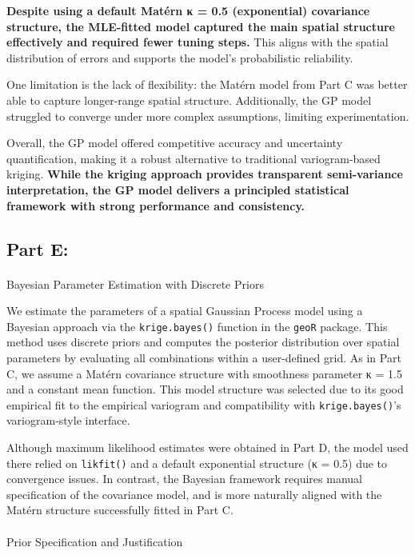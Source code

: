 \documentclass[
  11pt,
]{article}
\makeatletter
\let\oldparagraph\paragraph
\renewcommand{\paragraph}{
    \@ifstar
      \xxxParagraphStar
      \xxxParagraphNoStar
  }
\newcommand{\xxxParagraphStar}[1]{\oldparagraph*{#1}\mbox{}}
\newcommand{\xxxParagraphNoStar}[1]{\oldparagraph{#1}\mbox{}}
\makeatother
\begin{document}
\textbf{Despite using a default Matérn κ = 0.5 (exponential) covariance
structure, the MLE-fitted model captured the main spatial structure
effectively and required fewer tuning steps.} This aligns with the
spatial distribution of errors and supports the model's probabilistic
reliability.

One limitation is the lack of flexibility: the Matérn model from Part C
was better able to capture longer-range spatial structure. Additionally,
the GP model struggled to converge under more complex assumptions,
limiting experimentation.

Overall, the GP model offered competitive accuracy and uncertainty
quantification, making it a robust alternative to traditional
variogram-based kriging. \textbf{While the kriging approach provides
transparent semi-variance interpretation, the GP model delivers a
principled statistical framework with strong performance and
consistency.}

\subsection{Part E:}\label{part-e}

\paragraph{Bayesian Parameter Estimation with Discrete
Priors}\label{bayesian-parameter-estimation-with-discrete-priors}

We estimate the parameters of a spatial Gaussian Process model using a
Bayesian approach via the \texttt{krige.bayes()} function in the
\texttt{geoR} package. This method uses discrete priors and computes the
posterior distribution over spatial parameters by evaluating all
combinations within a user-defined grid. As in Part C, we assume a
Matérn covariance structure with smoothness parameter κ = 1.5 and a
constant mean function. This model structure was selected due to its
good empirical fit to the empirical variogram and compatibility with
\texttt{krige.bayes()}'s variogram-style interface.

Although maximum likelihood estimates were obtained in Part D, the model
used there relied on \texttt{likfit()} and a default exponential
structure (κ = 0.5) due to convergence issues. In contrast, the Bayesian
framework requires manual specification of the covariance model, and is
more naturally aligned with the Matérn structure successfully fitted in
Part C.

\paragraph{Prior Specification and
Justification}\label{prior-specification-and-justification}
\end{document}
